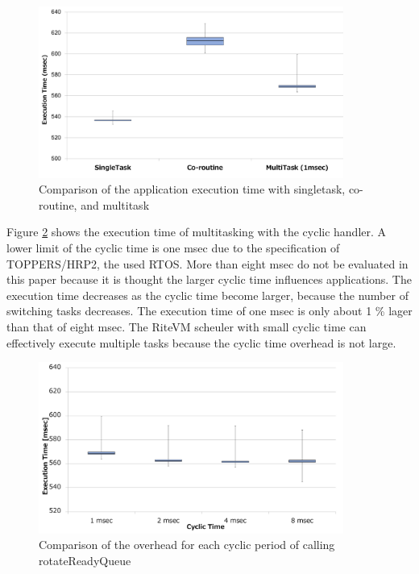 \documentclass[a4j,12pt,oneside,openany,english]{jsbook}
\begin{document}
\begin{figure}[t]
    \centering
    \includegraphics[width=10cm,clip]{../EMSOFT2016/figure/comparison_s_c_m.pdf}
    \caption{Comparison of the application execution time with singletask, co-routine, and multitask}
    \label{fig:comparison_s_c_m}
\end{figure}

Figure \ref{fig:comparison_msec} shows the execution time of multitasking with the cyclic handler.
A lower limit of the cyclic time is one msec due to the specification of TOPPERS/HRP2, the used RTOS.
More than eight msec do not be evaluated in this paper because it is thought the larger cyclic time influences applications.
The execution time decreases as the cyclic time become larger, because the number of switching tasks decreases.
The execution time of one msec is only about 1 \% lager than that of eight msec.
The RiteVM scheuler with small cyclic time can effectively execute multiple tasks because the cyclic time overhead is not large.

\begin{figure}[t]
    \centering
    \includegraphics[width=10cm,clip]{../EMSOFT2016/figure/comparison_msec.pdf}
    \caption{Comparison of the overhead for each cyclic period of calling rotateReadyQueue}
    \label{fig:comparison_msec}
\end{figure}
\end{document}
